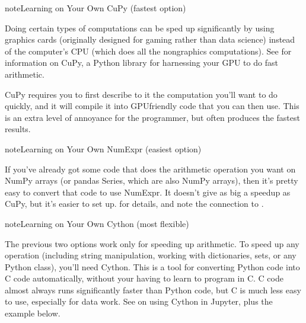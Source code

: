 \documentclass[letterpaper,10pt,english]{sphinxmanual}
\begin{document}
\begin{sphinxadmonition}{note}{Learning on Your Own \sphinxhyphen{} CuPy (fastest option)}

Doing certain types of computations can be sped up significantly by using graphics cards (originally designed for gaming rather than data science) instead of the computer’s CPU (which does all the non\sphinxhyphen{}graphics computations).  See  for information on CuPy, a Python library for harnessing your GPU to do fast arithmetic.

CuPy requires you to first describe to it the computation you’ll want to do quickly, and it will compile it into GPU\sphinxhyphen{}friendly code that you can then use.  This is an extra level of annoyance for the programmer, but often produces the fastest results.
\end{sphinxadmonition}

\begin{sphinxadmonition}{note}{Learning on Your Own \sphinxhyphen{} NumExpr (easiest option)}

If you’ve already got some code that does the arithmetic operation you want on NumPy arrays (or pandas Series, which are also NumPy arrays), then it’s pretty easy to convert that code to use NumExpr.  It doesn’t give as big a speedup as CuPy, but it’s easier to set up.   for details, and note the connection to .
\end{sphinxadmonition}

\begin{sphinxadmonition}{note}{Learning on Your Own \sphinxhyphen{} Cython (most flexible)}

The previous two options work only for speeding up arithmetic.  To speed up any operation (including string manipulation, working with dictionaries, sets, or any Python class), you’ll need Cython.  This is a tool for converting Python code into C code automatically, without your having to learn to program in C.  C code almost always runs significantly faster than Python code, but C is much less easy to use, especially for data work.  See  on using Cython in Jupyter, plus the example below.
\end{sphinxadmonition}
\end{document}
